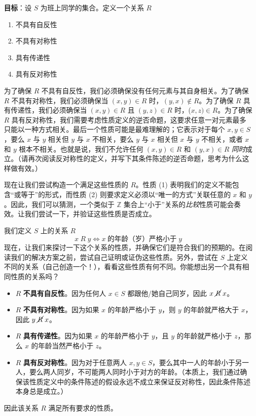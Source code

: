 \begin{example}
    \textbf{目标}：设 $S$ 为班上同学的集合。定义一个关系 $R$ 
    \begin{enumerate}[label=(\arabic*)]
        \item 不具有自反性
        \item 不具有对称性
        \item 具有传递性
        \item 具有反对称性
    \end{enumerate}

    为了确保 $R$ 不具有自反性，我们必须确保没有任何元素与其自身相关。为了确保 $R$ 不具有对称性，我们必须确保当 $(x, y) \in R$ 时，$(y, x) \notin R$。为了确保 $R$ 具有传递性，我们必须确保当 $(x, y) \in R$ 且 $(y, z) \in R$ 时，($x, z) \in R$。为了确保 $R$ 具有反对称性，我们需要考虑性质定义的逆否命题，这要求任意一对元素最多只能以一种方式相关。最后一个性质可能是最难理解的；它表示对于每个 $x, y \in S$，要么 $x$ 与 $y$ 相关但 $y$ 与 $x$ 不相关，要么 $y$ 与 $x$ 相关但 $x$ 与 $y$ 不相关，或者 $x$ 和 $y$ 根本不相关。也就是说，我们不允许任何 $(x, y) \in R$ 和 $(y, x) \in R$ \emph{同时}成立。（请再次阅读反对称性的定义，并写下其条件陈述的逆否命题，思考为什么这样做有效。）

    现在让我们尝试构造一个满足这些性质的 $R$。性质 (1) 表明我们的定义不能包含``或等于''的形式，而性质 (2) 则要求定义必须以``唯一的方式''关联任意的 $x$ 和 $y$。因此，我们可以猜测，一个类似于 $\mathbb{Z}$ 集合上``小于''关系的\emph{比较}性质可能会奏效。让我们尝试一下，并验证这些性质是否成立。

    我们定义 $S$ 上的关系 $R$
    \[x \;R\; y \iff x \;\text{的年龄（岁）严格小于}\; y\]
    现在，让我们来探讨一下这个关系的性质，并确保它们是符合我们的预期的。在阅读我们的解决方案之前，尝试自己证明或证伪这些性质。另外，尝试在 $S$ 上定义不同的关系（自己创造一个！），看看这些性质有何不同。你能想出另一个具有相同性质的关系吗？

    \begin{itemize}
        \item $R$ \textbf{不具有自反性}。因为任何人 $x \in S$ 都跟他/她自己同岁，因此 $x \;\cancel{R}\; x$。
        \item $R$ \textbf{不具有对称性}。因为如果 $x$ 的年龄严格小于 $y$，则 $y$ 的年龄就严格大于 $x$，因此 $y \;\cancel{R}\; x$。
        \item $R$ \textbf{具有传递性}。因为如果 $x$ 的年龄严格小于 $y$，且 $y$ 的年龄就严格小于 $z$，那么 $x$ 的年龄当然严格小于 $z$。
        \item $R$ \textbf{具有反对称性}。因为对于任意两人 $x, y \in S$，要么其中一人的年龄小于另一人，要么两人同岁，不可能两人同时小于对方的年龄。（本质上，我们通过确保该性质定义中的条件陈述的假设永远不成立来保证反对称性，因此条件陈述本身总是成立。）
    \end{itemize}

    因此该关系 $R$ 满足所有要求的性质。
\end{example}

